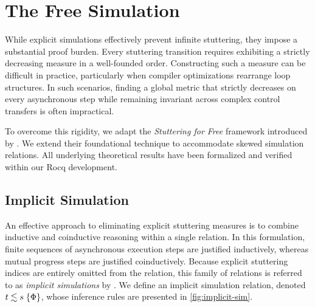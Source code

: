 \documentclass[report.tex]{subfiles}
\begin{document}
\section{The Free Simulation}

While explicit simulations effectively prevent infinite stuttering,
they impose a substantial proof burden.
Every stuttering transition requires exhibiting a strictly decreasing
measure in a well-founded order.
Constructing such a measure can be difficult in practice,
particularly when compiler optimizations rearrange loop structures.
In such scenarios,
finding a global metric that strictly decreases on every asynchronous step
while remaining invariant across complex control transfers
is often impractical.

To overcome this rigidity,
we adapt the \emph{Stuttering for Free} framework
introduced by \textcite{cho-23-stuttering}.
We extend their foundational technique to accommodate
skewed simulation relations.
All underlying theoretical results have been formalized and verified
within our Rocq development.

\subsection{Implicit Simulation}

An effective approach to eliminating explicit stuttering measures
is to combine inductive and coinductive reasoning within a single relation.
In this formulation,
finite sequences of asynchronous execution steps are justified inductively,
whereas mutual progress steps are justified coinductively.
Because explicit stuttering indices are entirely omitted from the relation,
this family of relations is referred to as \emph{implicit simulations}
by \textcite{cho-23-stuttering}.
We define an implicit simulation relation,
denoted $t \lesssim s \; \{\Phi\}$,
whose inference rules are presented in \cref{fig:implicit-sim}.
\end{document}
